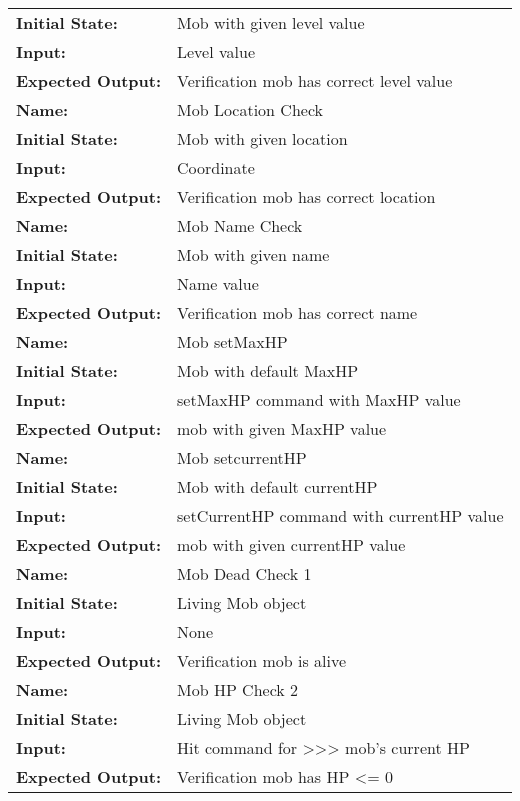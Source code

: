 \documentclass[12pt, titlepage]{article}
\begin{document}
\begin{center}
\begin{longtable}{ l | p{10cm} }
				\textbf{Initial State:} & Mob with given level value\\
				\textbf{Input:} & Level value\\
				\textbf{Expected Output:} & Verification mob has correct level value\\[1em]
				\hline
				\rule{0pt}{2em}\textbf{Name:} & Mob Location Check\\
				\textbf{Initial State:} & Mob with given location\\
				\textbf{Input:} & Coordinate\\
				\textbf{Expected Output:} & Verification mob has correct location\\[1em]
				\hline
				\rule{0pt}{2em}\textbf{Name:} & Mob Name Check\\
				\textbf{Initial State:} & Mob with given name\\
				\textbf{Input:} & Name value\\
				\textbf{Expected Output:} & Verification mob has correct name\\[1em]
				\hline
				\rule{0pt}{2em}\textbf{Name:} & Mob setMaxHP\\
				\textbf{Initial State:} & Mob with default MaxHP\\
				\textbf{Input:} & setMaxHP command with MaxHP value\\
				\textbf{Expected Output:} & mob with given MaxHP value\\[1em]
				\hline
				\rule{0pt}{2em}\textbf{Name:} & Mob setcurrentHP\\
				\textbf{Initial State:} & Mob with default currentHP\\
				\textbf{Input:} & setCurrentHP command with currentHP value\\
				\textbf{Expected Output:} & mob with given currentHP value\\[1em]
				\hline
				\rule{0pt}{2em}\textbf{Name:} & Mob Dead Check 1\\
				\textbf{Initial State:} & Living Mob object\\
				\textbf{Input:} & None\\
				\textbf{Expected Output:} & Verification mob is alive\\[1em]
				\hline
				\rule{0pt}{2em}\textbf{Name:} & Mob HP Check 2\\
				\textbf{Initial State:} & Living Mob object\\
				\textbf{Input:} & Hit command for >>> mob's current HP\\
				\textbf{Expected Output:} & Verification mob has HP <= 0\\[1em]

\end{longtable}
\end{center}
\end{document}
